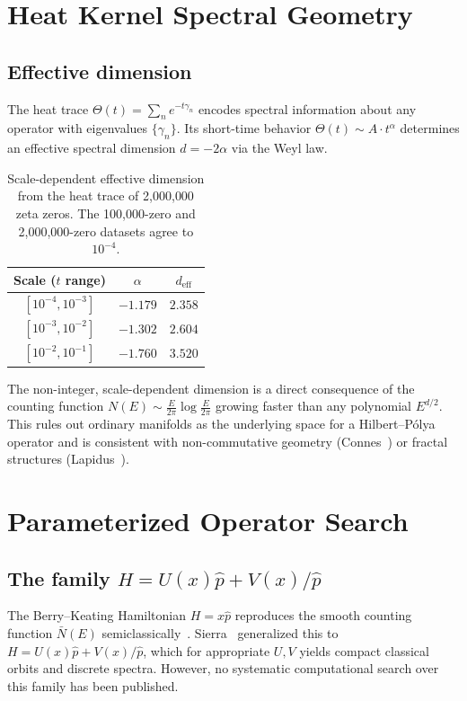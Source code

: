 \documentclass[11pt]{article}
\begin{document}
\section{Heat Kernel Spectral Geometry}

\subsection{Effective dimension}

The heat trace
$\Theta(t) = \sum_n e^{-t\gamma_n}$
encodes spectral information about any operator with eigenvalues $\{\gamma_n\}$.
Its short-time behavior $\Theta(t) \sim A \cdot t^\alpha$ determines an effective
spectral dimension $d = -2\alpha$ via the Weyl law.

\begin{table}[H]
\centering
\begin{tabular}{ccc}
\toprule
Scale ($t$ range) & $\alpha$ & $d_{\mathrm{eff}}$ \\
\midrule
$[10^{-4}, 10^{-3}]$ & $-1.179$ & $2.358$ \\
$[10^{-3}, 10^{-2}]$ & $-1.302$ & $2.604$ \\
$[10^{-2}, 10^{-1}]$ & $-1.760$ & $3.520$ \\
\bottomrule
\end{tabular}
\caption{Scale-dependent effective dimension from the heat trace of 2{,}000{,}000 zeta zeros.
The 100{,}000-zero and 2{,}000{,}000-zero datasets agree to $10^{-4}$.}
\end{table}

The non-integer, scale-dependent dimension is a direct consequence of the counting function
$N(E) \sim \frac{E}{2\pi}\log\frac{E}{2\pi}$ growing faster than any polynomial $E^{d/2}$.
This rules out ordinary manifolds as the underlying space for a Hilbert--P\'olya operator
and is consistent with non-commutative geometry (Connes~\cite{connes1999}) or fractal
structures (Lapidus~\cite{lapidus2008}).

\section{Parameterized Operator Search}

\subsection{The family $H = U(x)\hat{p} + V(x)/\hat{p}$}

The Berry--Keating Hamiltonian $H = x\hat{p}$ reproduces the smooth counting function
$\bar{N}(E)$ semiclassically~\cite{berry1999}. Sierra~\cite{sierra2011} generalized this
to $H = U(x)\hat{p} + V(x)/\hat{p}$, which for appropriate $U, V$ yields compact classical
orbits and discrete spectra. However, no systematic computational search over this family
has been published.
\end{document}
